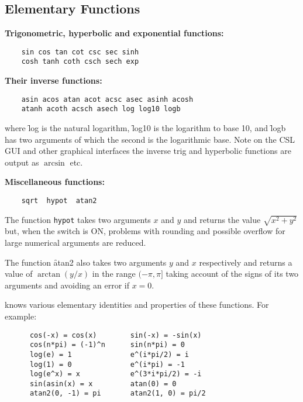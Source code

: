 \subsection{Elementary Functions}
\textbf{Trigonometric, hyperbolic and exponential functions:}
\begin{verbatim}
    sin cos tan cot csc sec sinh
    cosh tanh coth csch sech exp
\end{verbatim}

\textbf{Their inverse functions:}
\begin{verbatim}
    asin acos atan acot acsc asec asinh acosh
    atanh acoth acsch asech log log10 logb
\end{verbatim}
where \f{log} is the natural logarithm, \f{log10} is the logarithm to
base 10, and \f{logb} has two arguments of which the second is the
logarithmic base.  Note on the CSL GUI and other graphical interfaces
the inverse trig and hyperbolic functions are output as $\arcsin$ etc.

\textbf{Miscellaneous functions:}
\begin{verbatim}
    sqrt  hypot  atan2
\end{verbatim}
The function \texttt{hypot} takes two arguments $x$  and $y$ and
returns the value $\sqrt{x^2+y^2}$ but, when the switch  is ON,
problems with rounding and possible overflow for large numerical arguments
are reduced.

The function \f{atan2} also takes two arguments $y$ and $x$
respectively and returns a value of $\arctan(y/x)$ in the range
$(-\pi, \pi]$ taking account of the signs of its two arguments and
avoiding an error if $x=0$.

{\REDUCE} knows various elementary identities and properties
of these functions. For example:
\begin{verbatim}
      cos(-x) = cos(x)        sin(-x) = -sin(x)
      cos(n*pi) = (-1)^n      sin(n*pi) = 0
      log(e) = 1              e^(i*pi/2) = i
      log(1) = 0              e^(i*pi) = -1
      log(e^x) = x            e^(3*i*pi/2) = -i
      sin(asin(x) = x         atan(0) = 0
      atan2(0, -1) = pi       atan2(1, 0) = pi/2
\end{verbatim}

